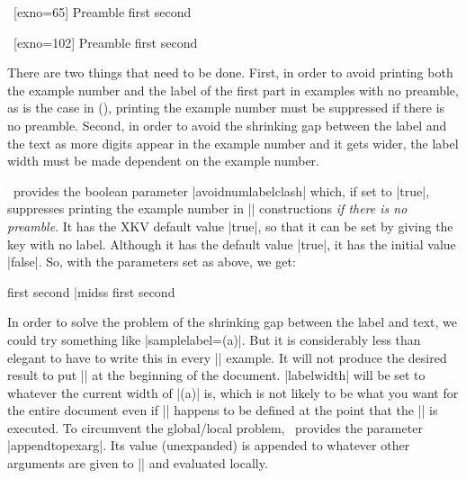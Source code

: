 \pex~[exno=65]
Preamble
\a first
\a second
\xe

\pex~[exno=102]
Preamble
\a first
\a second
\xe

There are two things that need to be done.  First, in order to
avoid printing both the example number and the label of the first
part in examples with no preamble, as is the case in
(), printing the example number must be suppressed
if there is no preamble. Second, in order to avoid the shrinking
gap between the label and the text as more digits appear in the
example number and it gets wider, the label width must be made
dependent on the example number.

\ExPex\ provides the boolean parameter |avoidnumlabelclash|
which, if set to |true|, suppresses printing the example number
in |\pex| constructions {\it if there is no preamble}.  It has
the XKV default value |true|, so that it can be set by giving the
key with no label.  Although it has the default value |true|, it
has the initial value |false|.  So, with the parameters set as
above, we get:

\beginss
\pex[exno=5,avoidnumlabelclash]
\a first
\a second
\xe|midss
\pex[exno=5,avoidnumlabelclash]
\a first
\a second
\xe
\endss

In order to solve the problem of the shrinking gap between the
label and text, we could try something like
|samplelabel=(\actualexno a)|. But it is considerably less than
elegant to have to write this in every |\pex| example.  It will
not produce the desired result to put
|| at the beginning of the
document.  |labelwidth| will be set to whatever the current width
of |(\actualexno a)| is, which is not likely to be what you want
for the entire document even if |\actualexno| happens to be
defined at the point that the |\lingset| is
executed.  To circumvent the global/local problem, \ExPex\
provides the parameter |appendtopexarg|.  Its value (unexpanded)
is appended to whatever other arguments are given to
|\pex| and evaluated locally.

